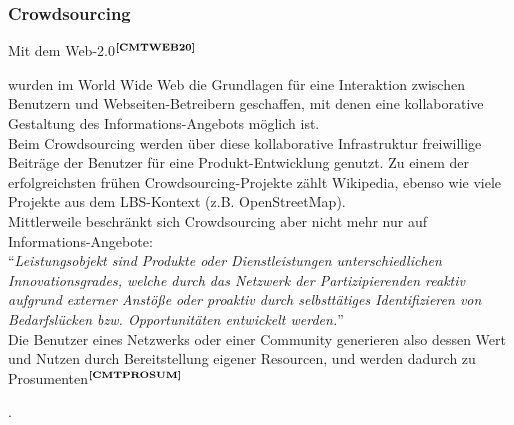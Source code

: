 \subsubsection{Crowdsourcing}
Mit dem Web-2.0$^{\textbf{\ref{CMTWEB20}}}$%
\addtocounter{footnote}{1}%
 wurden im World Wide Web die Grundlagen für eine Interaktion zwischen Benutzern und Webseiten-Betreibern
geschaffen, mit denen eine kollaborative Gestaltung des Informations-Angebots möglich ist.\\
Beim Crowdsourcing werden über diese kollaborative Infrastruktur freiwillige Beiträge der Benutzer für eine Produkt-Entwicklung genutzt. Zu einem der erfolgreichsten frühen Crowdsourcing-Projekte zählt Wikipedia, ebenso wie viele Projekte aus dem LBS-Kontext (z.B. OpenStreetMap).\\
Mittlerweile beschränkt sich Crowdsourcing aber nicht mehr nur auf Informations-Angebote:\\
"`\textit{Leistungsobjekt sind Produkte oder Dienstleistungen unterschiedlichen Innovationsgrades, welche durch das Netzwerk der Partizipierenden reaktiv aufgrund externer Anstöße oder proaktiv durch selbsttätiges Identifizieren von Bedarfslücken bzw. Opportunitäten entwickelt werden.}"'\cite{WIKI:CROWDSRC}\\
Die Benutzer eines Netzwerks oder einer Community generieren also dessen Wert und Nutzen durch Bereitstellung eigener Resourcen, und werden dadurch zu Prosumenten$^{\textbf{\ref{CMTPROSUM}}}$%
\addtocounter{footnote}{1}%
.

